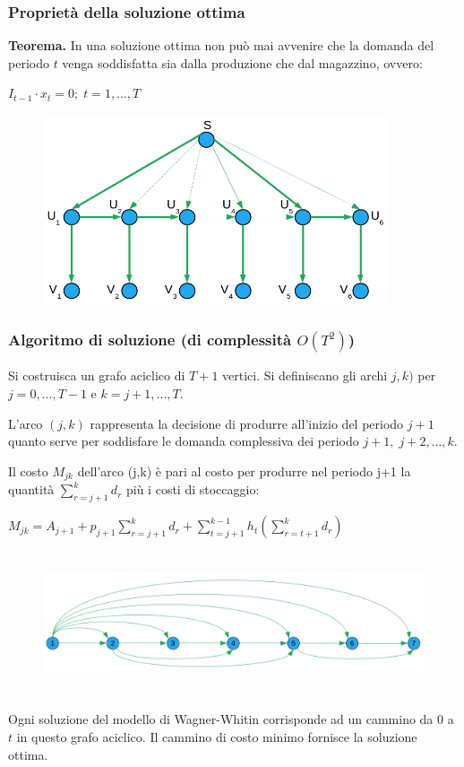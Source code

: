 \subsubsection{Proprietà della soluzione ottima}
\textbf{Teorema.} In una soluzione ottima non può mai avvenire che la domanda del periodo $t$ venga soddisfatta sia dalla produzione che dal magazzino, ovvero:
\begin{center}
	$I_{t-1}\cdot x_{t}=0;\;t=1,...,T$
\end{center}
\begin{figure}[H]
	\caption{}
	\centering
	\includegraphics[height=5.6cm]{images/graph4.png}
	\label{fig:PossibileSoluzione}
\end{figure}

\subsubsection{Algoritmo di soluzione (di complessità $O(T^{2})$)}
Si costruisca un grafo aciclico di $T+1$ vertici.\newline
Si definiscano gli archi $j,k)$ per $j=0,...,T-1$ e $k=j+1,...,T$.

L'arco $(j,k)$ rappresenta la decisione di produrre all'inizio del periodo $j+1$ quanto serve per soddisfare le domanda complessiva dei periodo $j+1,\;j+2,...,k$.

Il costo $M_{jk}$ dell'arco (j,k) è pari al costo per produrre nel periodo j+1 la quantità $\sum_{r=j+1}^{k}d_{r}$ più i costi di stoccaggio:
\begin{center}
	$M_{jk}=A_{j+1}+p_{j+1}\displaystyle\sum_{r=j+1}^{k}d_{r}+\sum_{t=j+1}^{k-1}h_{t}(\sum_{r=t+1}^{k}d_{r})$
\end{center}
\begin{figure}[H]
	\caption{}
	\centering
	\includegraphics[height=4.2cm]{images/graph5.png}
	\label{fig:PossibileSoluzione2}
\end{figure}

Ogni soluzione del modello di Wagner-Whitin corrisponde ad un cammino da $0$ a $t$ in questo grafo aciclico.\newline
Il cammino di costo minimo fornisce la soluzione ottima.